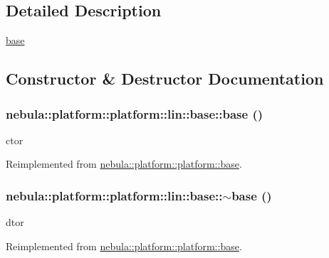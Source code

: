 \subsection{Detailed Description}
\hyperlink{classnebula_1_1platform_1_1platform_1_1lin_1_1base}{base} 

\subsection{Constructor \& Destructor Documentation}
\hypertarget{classnebula_1_1platform_1_1platform_1_1lin_1_1base_a38e8ff4fedc0399fc7468a996e35980d}{
\subsubsection[{base}]{\setlength{\rightskip}{0pt plus 5cm}nebula::platform::platform::lin::base::base ()}}
\label{classnebula_1_1platform_1_1platform_1_1lin_1_1base_a38e8ff4fedc0399fc7468a996e35980d}


ctor 

Reimplemented from \hyperlink{classnebula_1_1platform_1_1platform_1_1base_ab5473b3326da0afc860eec802b01fcf8}{nebula::platform::platform::base}.\hypertarget{classnebula_1_1platform_1_1platform_1_1lin_1_1base_ad8bab5e66dd9f92205ec2585c49df4e0}{
\subsubsection[{$\sim$base}]{\setlength{\rightskip}{0pt plus 5cm}nebula::platform::platform::lin::base::$\sim$base ()}}
\label{classnebula_1_1platform_1_1platform_1_1lin_1_1base_ad8bab5e66dd9f92205ec2585c49df4e0}


dtor 

Reimplemented from \hyperlink{classnebula_1_1platform_1_1platform_1_1base_af06e978c1a4676fb040758a35a8c2ea1}{nebula::platform::platform::base}.

